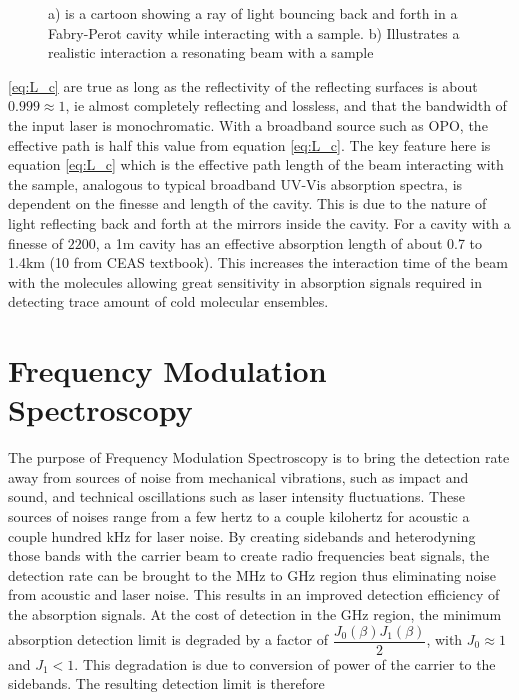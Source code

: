 \documentclass[11pt,a4paper]{book}
\newcommand{\imginput}[1]{} %
\begin{document}
		\begin{figure} [!ht]
			\centering
			\def\svgwidth{\columnwidth}
			\resizebox{14.5cm}{!}{\imginput{images/CEAS-cartoon.pdf_tex}}
			\label{fig:CEAS}
			\caption{a) is a cartoon showing a ray of light bouncing back and forth in a Fabry-Perot cavity while interacting with a sample. b) Illustrates a realistic interaction a resonating beam with a sample }
		\end{figure}
		
		\noindent
		\autoref{eq:L_c} are true as long as the reflectivity of the reflecting surfaces is about $0.999 \approx 1$, ie almost completely reflecting and lossless, and that the bandwidth of the input laser is monochromatic. With a broadband source such as OPO, the effective path is half this value from equation \autoref{eq:L_c}. 
		The key feature here is equation \autoref{eq:L_c} which is the effective path length of the beam interacting with the sample, analogous to typical broadband UV-Vis absorption spectra, is dependent on the finesse and length of the cavity. 
		This is due to the nature of light reflecting back and forth at the mirrors inside the cavity. For a cavity with a finesse of $2200$, a 1m cavity has an effective absorption length of about 0.7 to 1.4km (10 from CEAS textbook). 
		This increases the interaction time of the beam with the molecules allowing great sensitivity in absorption signals required in detecting trace amount of cold molecular ensembles.
	
	\section{Frequency Modulation Spectroscopy}
		\label{sec:Frequency Modulation Spectroscopy}
		The purpose of Frequency Modulation Spectroscopy is to bring the detection rate away from sources of noise from mechanical vibrations, such as impact and sound, and technical oscillations such as laser intensity fluctuations. These sources of noises range from a few hertz to a couple kilohertz for acoustic a couple hundred kHz for laser noise.  By creating sidebands and heterodyning those bands with the carrier beam to create radio frequencies beat signals, the detection rate can be brought to the MHz to GHz region thus eliminating noise from acoustic and laser noise. This results in an improved detection efficiency of the absorption signals. At the cost of detection in the GHz region, the minimum absorption detection limit is degraded by a factor of $\dfrac{J_0(\beta)J_1(\beta)}{2}$, with $J_0 \approx 1$ and $J_1 < 1 $. This degradation is due to conversion of power of the carrier to the sidebands. The resulting detection limit is therefore
		
\end{document}
